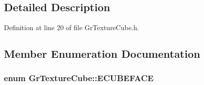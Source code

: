 \begin{CompactItemize}
\subsection{Detailed Description}


Definition at line 20 of file GrTextureCube.h.

\subsection{Member Enumeration Documentation}
\hypertarget{class_gr_texture_cube_49c6f83c73520edfce04f4eb5dcfe6a0}{
\subsubsection[{ECUBEFACE}]{\setlength{\rightskip}{0pt plus 5cm}enum {\bf GrTextureCube::ECUBEFACE}}}
\label{class_gr_texture_cube_49c6f83c73520edfce04f4eb5dcfe6a0}



\end{CompactItemize}
